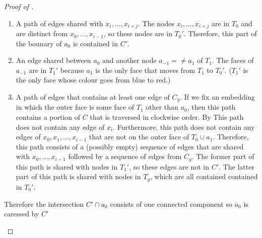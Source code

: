 \documentclass{patmorin}
\begin{document}
\begin{proof}[Proof of ]
\begin{enumerate}
\begin{enumerate}
     \item A path of edges shared with $x_i,\ldots,x_{i+j}$.
      The nodes $x_i,\ldots,x_{i+j}$ are in $T_0$ and are distinct from
      $x_0,\ldots,x_{i-1}$, so these nodes are in $T_0'$.
      Therefore, this part of the bounary of $a_0$ is contained in $C'$.

     \item An edge shared between $a_0$ and another node $a_{-1}=\neq
     a_1$ of $T_1$. The faces of $a_{-1}$ are in $T_1'$ because $a_1$
     is the only face that moves from $T_1$ to $T_0'$. ($T_1'$ is the
     only face whose colour goes from blue to red.)

     \item A path of edges that contains at least one edge of $C_y$. If
     we fix an embedding in which the outer face is some face of $T_1$
     other than $a_0$, then this path contains a portion of $C$ that
     is traversed in clockwise order. By 
     This path does not contain any edge of $x_i$.  Furthermore, this
     path does not contain any edges of $x_0,x_1,\ldots,x_{i-1}$ that
     are not on the outer face of $T_0\cup a_1$.  Therefore, this path
     consists of a (possibly empty) sequence of edges that are shared with
     $x_0,\ldots,x_{i-1}$ followed by a sequence of edges from $C_y$. The
     former part of this path is shared with nodes in $T_1'$, so these
     edges are not in $C'$.  The latter part of this path is shared with
     nodes in $T_y$, which are all contained contained in $T_0'$.
  \end{enumerate} 
  Therefore the intersection $C'\cap a_0$ consists of one connected
  component so $a_0$ is caressed by $C'$
\end{enumerate}
%  
%

\end{proof}
\end{document}
